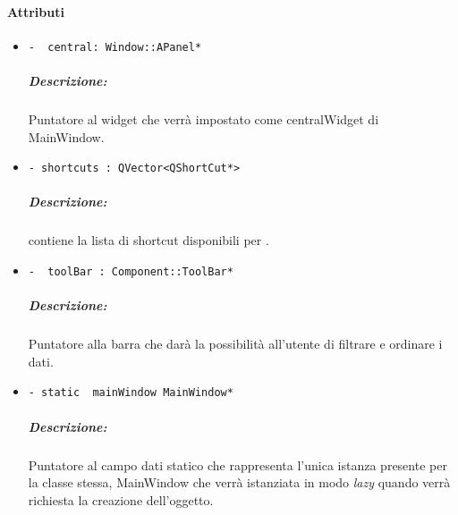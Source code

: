 \paragraph{\color{black}Attributi \\}
\begin{itemize}
\item \color{teal}\verb!-  central: Window::APanel*!
\color{black}
\subparagraph{Descrizione:} Puntatore al widget che verrà impostato come centralWidget di MainWindow.

\item \color{teal}\verb!- shortcuts : QVector<QShortCut*>!
\color{black}
\subparagraph{Descrizione:} contiene la lista di shortcut disponibili per \project{}.
\item \color{teal}\verb!-  toolBar : Component::ToolBar*!
\color{black}
\subparagraph{Descrizione:} Puntatore alla barra che darà la possibilità all'utente di filtrare e ordinare i dati. 

\item \color{teal}\verb!- static  mainWindow MainWindow*!
\color{black} 
\subparagraph{Descrizione:} Puntatore al campo dati statico che rappresenta l'unica istanza presente per la classe stessa, MainWindow che verrà istanziata in modo \emph{lazy} quando verrà richiesta la creazione dell'oggetto. 
\end{itemize}
